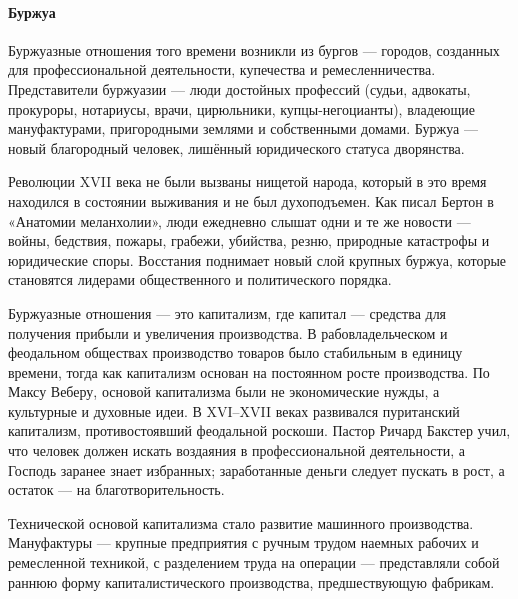 \paragraph{Буржуа}

Буржуазные отношения того времени возникли из бургов --- городов, созданных для профессиональной деятельности, купечества и ремесленничества. Представители буржуазии --- люди достойных профессий (судьи, адвокаты, прокуроры, нотариусы, врачи, цирюльники, купцы-негоцианты), владеющие мануфактурами, пригородными землями и собственными домами. Буржуа --- новый благородный человек, лишённый юридического статуса дворянства.

Революции XVII века не были вызваны нищетой народа, который в это время находился в состоянии выживания и не был духоподъемен. Как писал Бертон в «Анатомии меланхолии», люди ежедневно слышат одни и те же новости --- войны, бедствия, пожары, грабежи, убийства, резню, природные катастрофы и юридические споры. Восстания поднимает новый слой крупных буржуа, которые становятся лидерами общественного и политического порядка.

Буржуазные отношения --- это капитализм, где капитал --- средства для получения прибыли и увеличения производства. В рабовладельческом и феодальном обществах производство товаров было стабильным в единицу времени, тогда как капитализм основан на постоянном росте производства.
По Максу Веберу, основой капитализма были не экономические нужды, а культурные и духовные идеи. В XVI–XVII веках развивался пуританский капитализм, противостоявший феодальной роскоши. Пастор Ричард Бакстер учил, что человек должен искать воздаяния в профессиональной деятельности, а Господь заранее знает избранных; заработанные деньги следует пускать в рост, а остаток --- на благотворительность.

Технической основой капитализма стало развитие машинного производства. Мануфактуры --- крупные предприятия с ручным трудом наемных рабочих и ремесленной техникой, с разделением труда на операции --- представляли собой раннюю форму капиталистического производства, предшествующую фабрикам.




